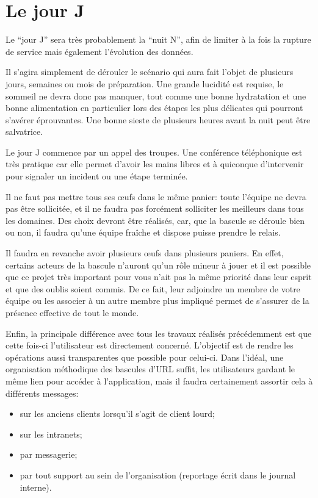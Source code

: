 \documentclass{book}
\begin{document}
\section{Le jour J}

Le ``jour J'' sera très probablement la ``nuit N'', afin de limiter à la fois la rupture de service mais également l'évolution des données.

Il s'agira simplement de dérouler le scénario qui aura fait l'objet de plusieurs jours, semaines ou mois de préparation. Une grande lucidité est requise, le sommeil ne devra donc pas manquer, tout comme une bonne hydratation et une bonne alimentation en particulier lors des étapes les plus délicates qui pourront s'avérer éprouvantes. Une bonne sieste de plusieurs heures avant la nuit peut être salvatrice.

Le jour J commence par un appel des troupes. Une conférence téléphonique est très pratique car elle permet d'avoir les mains libres et à quiconque d'intervenir pour signaler un incident ou une étape terminée.

Il ne faut pas mettre tous ses œufs dans le même panier: toute l'équipe ne devra pas être sollicitée, et il ne faudra pas forcément solliciter les meilleurs dans tous les domaines. Des choix devront être réalisés, car, que la bascule se déroule bien ou non, il faudra qu'une équipe fraîche et dispose puisse prendre le relais.

Il faudra en revanche avoir plusieurs œufs dans plusieurs paniers. En effet, certains acteurs de la bascule n'auront qu'un rôle mineur à jouer et il est possible que ce projet très important pour vous n'ait pas la même priorité dans leur esprit et que des oublis soient commis. De ce fait, leur adjoindre un membre de votre équipe ou les associer à un autre membre plus impliqué permet de s'assurer de la présence effective de tout le monde.

Enfin, la principale différence avec tous les travaux réalisés précédemment est que cette fois-ci l'utilisateur est directement concerné. L'objectif est de rendre les opérations aussi transparentes que possible pour celui-ci. Dans l'idéal, une organisation méthodique des bascules d'URL suffit, les utilisateurs gardant le même lien pour accéder à l'application, mais il faudra certainement assortir cela à différents messages:
\begin{itemize}
 \item sur les anciens \gls{client}s lorsqu'il s'agit de \gls{client} lourd;
 \item sur les intranets;
 \item par messagerie;
 \item par tout support au sein de l'organisation (reportage écrit dans le journal interne).
\end{itemize}
\end{document}
